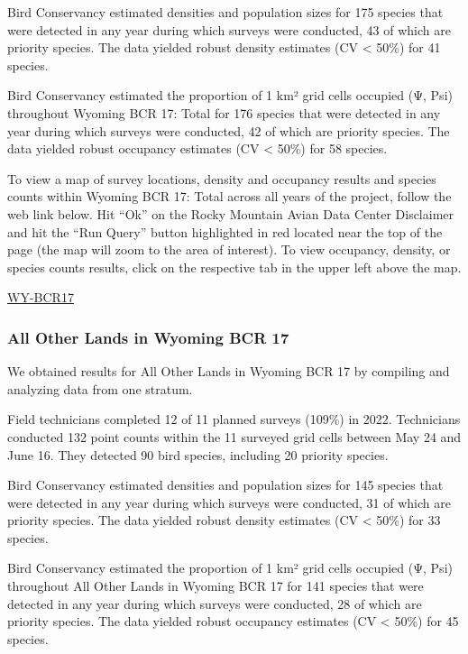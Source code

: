 \documentclass[
  letterpaper,
  DIV=11,
  numbers=noendperiod,
  oneside]{scrreprt}
\begin{document}
Bird Conservancy estimated densities and population sizes for 175
species that were detected in any year during which surveys were
conducted, 43 of which are priority species. The data yielded robust
density estimates (CV \textless{} 50\%) for 41 species.

Bird Conservancy estimated the proportion of 1 km² grid cells occupied
(Ψ, Psi) throughout Wyoming BCR 17: Total for 176 species that were
detected in any year during which surveys were conducted, 42 of which
are priority species. The data yielded robust occupancy estimates (CV
\textless{} 50\%) for 58 species.

To view a map of survey locations, density and occupancy results and
species counts within Wyoming BCR 17: Total across all years of the
project, follow the web link below. Hit ``Ok'' on the Rocky Mountain
Avian Data Center Disclaimer and hit the ``Run Query'' button
highlighted in red located near the top of the page (the map will zoom
to the area of interest). To view occupancy, density, or species counts
results, click on the respective tab in the upper left above the map.

\href{http://www.rmbo.org/new_site/adc/QueryWindow.aspx\#N4IgzgrgDgpgTmALnAhoiBbEAuABCAdQE0BaAIQGEAlARgHYQBfIA===}{WY-BCR17}

\hypertarget{all-other-lands-in-wyoming-bcr-17}{%
\subsubsection{All Other Lands in Wyoming BCR
17}\label{all-other-lands-in-wyoming-bcr-17}}

We obtained results for All Other Lands in Wyoming BCR 17 by compiling
and analyzing data from one stratum.

Field technicians completed 12 of 11 planned surveys (109\%) in 2022.
Technicians conducted 132 point counts within the 11 surveyed grid cells
between May 24 and June 16. They detected 90 bird species, including 20
priority species.

Bird Conservancy estimated densities and population sizes for 145
species that were detected in any year during which surveys were
conducted, 31 of which are priority species. The data yielded robust
density estimates (CV \textless{} 50\%) for 33 species.

Bird Conservancy estimated the proportion of 1 km² grid cells occupied
(Ψ, Psi) throughout All Other Lands in Wyoming BCR 17 for 141 species
that were detected in any year during which surveys were conducted, 28
of which are priority species. The data yielded robust occupancy
estimates (CV \textless{} 50\%) for 45 species.
\end{document}
